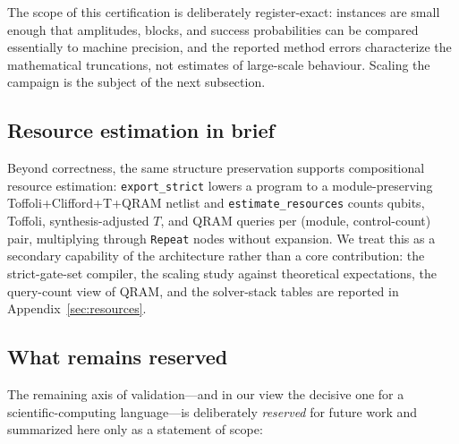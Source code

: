 The scope of this certification is deliberately register-exact: instances
are small enough that amplitudes, blocks, and success probabilities can be
compared essentially to machine precision, and the reported method errors
characterize the mathematical truncations, not estimates of large-scale
behaviour.  Scaling the campaign is the subject of the next subsection.

\subsection{Resource estimation in brief}
\label{sec:resources-summary}

Beyond correctness, the same structure preservation supports compositional
resource estimation: \texttt{export\_strict} lowers a program to a
module-preserving Toffoli+Clifford+T+QRAM netlist and
\texttt{estimate\_resources} counts qubits, Toffoli, synthesis-adjusted
$T$, and QRAM queries per (module, control-count) pair, multiplying
through \texttt{Repeat} nodes without expansion.  We treat this as a
secondary capability of the architecture rather than a core contribution:
the strict-gate-set compiler, the scaling study against theoretical
expectations, the query-count view of QRAM, and the solver-stack tables
are reported in Appendix~\ref{sec:resources}.

\subsection{What remains reserved}
\label{sec:reserved}

The remaining axis of validation---and in our view the decisive one for a
scientific-computing language---is deliberately \emph{reserved} for future
work and summarized here only as a statement of scope:

